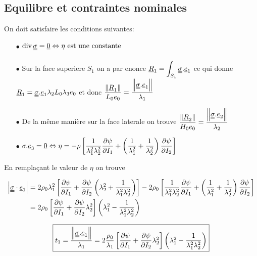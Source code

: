 \documentclass[a4paper,11pt]{article}
\newcommand{\FRAC}{\displaystyle\frac}
\newcommand{\tens}{\uuline}
\newcommand{\verseur}[1]{\uline{e}_{#1}}
\newcommand{\dive}{\mathop{\rm div}}
\begin{document}
\subsection{Equilibre et contraintes nominales}

On doit satisfaire les conditions suivantes:
\begin{itemize}
	\item[$\bullet$] $\dive{\uuline{\sigma}}=\uline{0} \Leftrightarrow \eta \text{ est une constante}$
	\item[$\bullet$] Sur la face superiere $S_1$ on a par enonce $\displaystyle \uline{R}_1=\displaystyle \int_{S_1}\uuline{\sigma}.\uline{e}_1$ ce qui donne $\uline{R}_1=\uuline{\sigma}.\uline{e}_1\lambda_2L_0\lambda_3e_0$ et donc $\dfrac{\left\|\uline{R}_1\right\|}{L_0e_0}=\dfrac{\left\|\uuline{\sigma}.\uline{e}_1\right\|}{\lambda_1}$
	
	\item[$\bullet$] De la m\^eme mani\`ere sur la face laterale on trouve $\dfrac{\left\|\uline{R}_2\right\|}{H_0e_0}=\dfrac{\left\|\uuline{\sigma}.\uline{e}_2\right\|}{\lambda_2}$
	\item[$\bullet$] $\displaystyle\sigma.\uline{e}_3=\uline{0}\Leftrightarrow \eta=-\rho\left[\dfrac{1}{\lambda_1^2\lambda_2^2}\dfrac{\partial \psi}{\partial I_1}+\left(\dfrac{1}{\lambda_1^2}+\dfrac{1}{\lambda_2^2}\right)\dfrac{\partial \psi}{\partial I_2}\right] $
\end{itemize}

En remplaçant le valeur de $\eta$ on trouve

\begin{align*}
\left| \tens{\sigma} \cdot \verseur{1} \right| &= 2 \rho_0 \lambda_1^2 \left[ \FRAC{\partial\psi}{\partial I_1} + \FRAC{\partial\psi}{\partial I_2} \left( \lambda_2^2 + \FRAC{1}{\lambda_1^2 \lambda_2^2} \right) \right] - 2 \rho_0 \left[  \FRAC{1}{\lambda_1^2 \lambda_2^2} \FRAC{\partial\psi}{\partial I_1} + \left( \FRAC{1}{\lambda_1^2} + \FRAC{1}{\lambda_2^2} \right) \FRAC{\partial\psi}{\partial I_2} \right]\\
&=2\rho_0\left[\dfrac{\partial \psi}{\partial I_1}+\dfrac{\partial \psi}{\partial I_2}\lambda_2^2\right]\left(\lambda_1^2-\dfrac{1}{\lambda_1^2\lambda_2^2} \right)
\end{align*}

$$ \fbox{$t_1=\dfrac{\left\|\uuline{\sigma}.\uline{e}_1\right\|}{\lambda_1}= 2\dfrac{\rho_0}{\lambda_1}\left[\dfrac{\partial \psi}{\partial I_1}+\dfrac{\partial \psi}{\partial I_2}\lambda_2^2\right]\left(\lambda_1^2-\dfrac{1}{\lambda_1^2\lambda_2^2} \right)$}
$$
\end{document}
